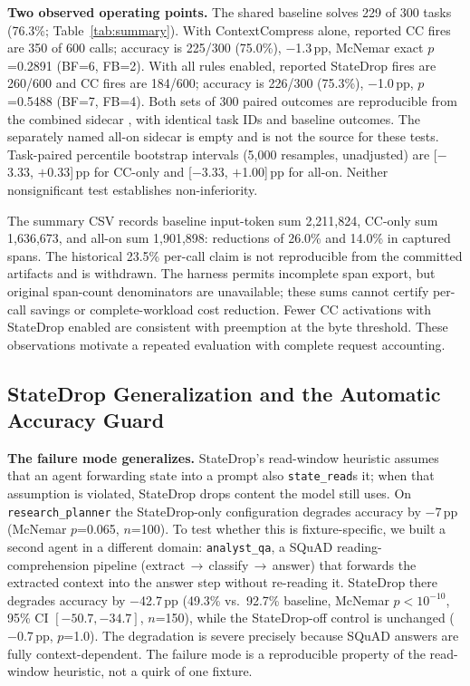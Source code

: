 \textbf{Two observed operating points.} The shared baseline solves 229 of 300
tasks (76.3\%; Table~\ref{tab:summary}). With ContextCompress alone, reported CC
fires are 350 of 600 calls; accuracy is 225/300 (75.0\%), $-$1.3\,pp, McNemar exact
$p$=0.2891 (BF=6, FB=2). With all rules enabled, reported StateDrop fires are
260/600 and CC fires are 184/600; accuracy is 226/300 (75.3\%), $-$1.0\,pp,
$p$=0.5488 (BF=7, FB=4). Both sets of 300 paired outcomes are reproducible from
the combined sidecar , with identical
task IDs and baseline outcomes. The separately named all-on sidecar is empty and
is not the source for these tests. Task-paired percentile bootstrap intervals
(5,000 resamples, unadjusted) are [$-$3.33, $+$0.33]\,pp for CC-only and
[$-$3.33, $+$1.00]\,pp for all-on. Neither nonsignificant test establishes
non-inferiority.

The summary CSV records baseline input-token sum 2,211,824, CC-only sum 1,636,673,
and all-on sum 1,901,898: reductions of 26.0\% and 14.0\% in captured spans.
The historical 23.5\% per-call claim is not reproducible from the committed
artifacts and is withdrawn. The harness permits incomplete span export, but
original span-count denominators are unavailable; these sums cannot certify
per-call savings or complete-workload cost reduction. Fewer CC activations with
StateDrop enabled are consistent with preemption at the byte threshold. These
observations motivate a repeated evaluation with complete request accounting.

\subsection{StateDrop Generalization and the Automatic Accuracy Guard}
\label{sec:eval-guard}

\textbf{The failure mode generalizes.} StateDrop's read-window heuristic assumes that an
agent forwarding state into a prompt also \texttt{state\_read}s it; when that assumption
is violated, StateDrop drops content the model still uses. On \texttt{research\_planner}
the StateDrop-only configuration degrades accuracy by $-$7\,pp (McNemar $p$=0.065,
$n$=100). To test whether this is fixture-specific, we built a second agent in a
different domain: \texttt{analyst\_qa}, a SQuAD reading-comprehension pipeline
(extract\,$\rightarrow$\,classify\,$\rightarrow$\,answer) that forwards the extracted
context into the answer step without re-reading it. StateDrop there degrades accuracy by
$-$42.7\,pp (49.3\% vs.\ 92.7\% baseline, McNemar $p<10^{-10}$, 95\% CI $[-50.7,-34.7]$,
$n$=150), while the StateDrop-off control is unchanged ($-$0.7\,pp, $p$=1.0). The
degradation is severe precisely because SQuAD answers are fully context-dependent. The
failure mode is a reproducible property of the read-window heuristic, not a quirk of one
fixture.

